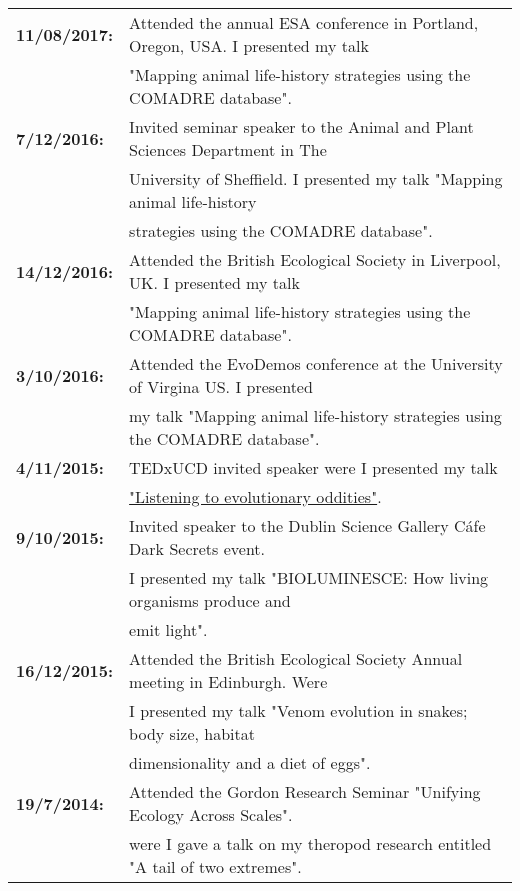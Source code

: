 \documentclass[10pt,a4paper]{article}
\begin{document}
\begin{flushleft}
\raggedright
\begin{tabular}{ll}
\textbf{11/08/2017:} & Attended the annual ESA conference in Portland, Oregon, USA. I presented my talk\\ 
& "Mapping animal life-history strategies using the COMADRE database".\\ 
\textbf{7/12/2016:} & Invited seminar speaker to the Animal and Plant Sciences Department in The\\
& University of Sheffield. I presented my talk "Mapping animal life-history\\
& strategies using the COMADRE database".\\
\textbf{14/12/2016:} & Attended the British Ecological Society in Liverpool, UK. I presented my talk\\ 
& "Mapping animal life-history strategies using the COMADRE database".\\ 
\textbf{3/10/2016:} & Attended the EvoDemos conference at the University of Virgina US. I presented\\ 
& my talk "Mapping animal life-history strategies using the COMADRE database".\\
\textbf{4/11/2015:} & TEDxUCD invited speaker were I presented my talk\\
& \href{https://www.youtube.com/watch?v=-CHtfWEKifY}{"Listening to evolutionary oddities"}.\\ 
\textbf{9/10/2015:} & Invited speaker to the Dublin Science Gallery Cáfe Dark Secrets event.\\ 
& I presented my talk "BIOLUMINESCE: How living organisms produce and\\ 
& emit light".\\
\textbf{16/12/2015:} & Attended the British Ecological Society Annual meeting in Edinburgh. Were\\ 
& I presented my talk "Venom evolution in snakes; body size, habitat\\
& dimensionality and a diet of eggs".\\
\textbf{19/7/2014:} & Attended the Gordon Research Seminar "Unifying Ecology Across Scales".\\ 
& were I gave a talk on my theropod research entitled "A tail of two extremes".\\

\end{tabular}
\end{flushleft}
\end{document}
